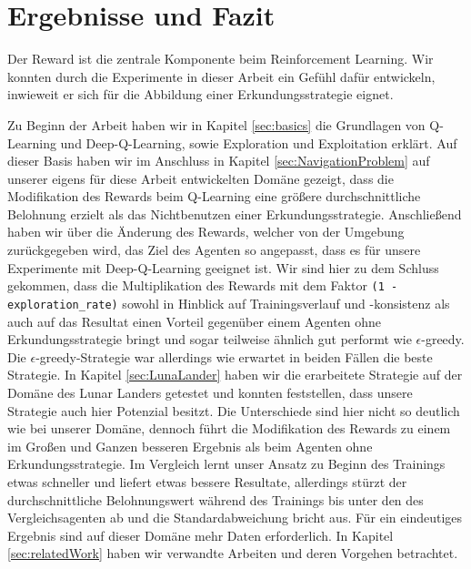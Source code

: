 \chapter{Ergebnisse und Fazit} \label{sec:conclusion}
Der Reward ist die zentrale Komponente beim Reinforcement Learning. Wir konnten durch die Experimente in dieser Arbeit ein Gefühl dafür entwickeln, inwieweit er sich für die Abbildung einer Erkundungsstrategie eignet.

Zu Beginn der Arbeit haben wir in Kapitel \ref{sec:basics} die Grundlagen von Q-Learning und Deep-Q-Learning, sowie Exploration und Exploitation erklärt. Auf dieser Basis haben wir im Anschluss in Kapitel \ref{sec:NavigationProblem} auf unserer eigens für diese Arbeit entwickelten Domäne gezeigt, dass die Modifikation des Rewards beim Q-Learning eine größere durchschnittliche Belohnung erzielt als das Nichtbenutzen einer Erkundungsstrategie. Anschließend haben wir über die Änderung des Rewards, welcher von der Umgebung zurückgegeben wird, das Ziel des Agenten so angepasst, dass es für unsere Experimente mit Deep-Q-Learning geeignet ist. Wir sind hier zu dem Schluss gekommen, dass die Multiplikation des Rewards mit dem Faktor \texttt{(1 - exploration_rate)} sowohl in Hinblick auf Trainingsverlauf und -konsistenz als auch auf das Resultat einen Vorteil gegenüber einem Agenten ohne Erkundungsstrategie bringt und sogar teilweise ähnlich gut performt wie $ \epsilon $-greedy. Die $ \epsilon $-greedy-Strategie war allerdings wie erwartet in beiden Fällen die beste Strategie. In Kapitel \ref{sec:LunaLander} haben wir die erarbeitete Strategie auf der Domäne des Lunar Landers getestet und konnten feststellen, dass unsere Strategie auch hier Potenzial besitzt. Die Unterschiede sind hier nicht so deutlich wie bei unserer Domäne, dennoch führt die Modifikation des Rewards zu einem im Großen und Ganzen besseren Ergebnis als beim Agenten ohne Erkundungsstrategie. Im Vergleich lernt unser Ansatz zu Beginn des Trainings etwas schneller und liefert etwas bessere Resultate, allerdings stürzt der durchschnittliche Belohnungswert während des Trainings bis unter den des Vergleichsagenten ab und die Standardabweichung bricht aus. Für ein eindeutiges Ergebnis sind auf dieser Domäne mehr Daten erforderlich. In Kapitel \ref{sec:relatedWork} haben wir verwandte Arbeiten und deren Vorgehen betrachtet. 

